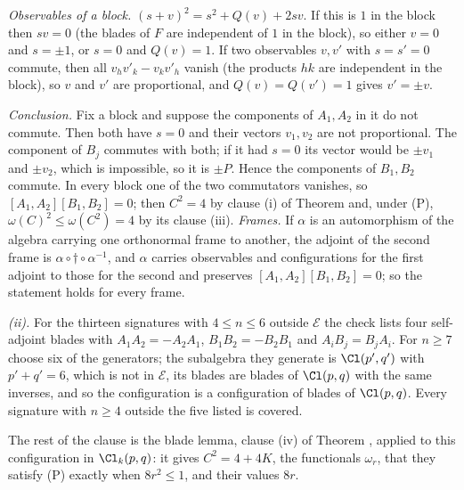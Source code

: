 \emph{Observables of a block.} $(s + v)^{2} = s^{2} + Q(v) + 2sv$. If this is $1$ in the block then $sv = 0$ (the blades of $F$ are independent of $1$ in the block), so either $v = 0$ and $s = \pm 1$, or $s = 0$ and $Q(v) = 1$. If two observables $v, v'$ with $s = s' = 0$ commute, then all $v_{h}v'_{k} - v_{k}v'_{h}$ vanish (the products $hk$ are independent in the block), so $v$ and $v'$ are proportional, and $Q(v) = Q(v') = 1$ gives $v' = \pm v$.

\emph{Conclusion.} Fix a block and suppose the components of $A_{1}, A_{2}$ in it do not commute. Then both have $s = 0$ and their vectors $v_{1}, v_{2}$ are not proportional. The component of $B_{j}$ commutes with both; if it had $s = 0$ its vector would be $\pm v_{1}$ and $\pm v_{2}$, which is impossible, so it is $\pm P$. Hence the components of $B_{1}, B_{2}$ commute. In every block one of the two commutators vanishes, so $[A_{1},A_{2}][B_{1},B_{2}] = 0$; then $C^{2} = 4$ by clause (i) of Theorem  and, under (P), $\omega(C)^{2} \le \omega(C^{2}) = 4$ by its clause (iii). \emph{Frames.} If $\alpha$ is an automorphism of the algebra carrying one orthonormal frame to another, the adjoint of the second frame is $\alpha \circ \dagger \circ \alpha^{-1}$, and $\alpha$ carries observables and configurations for the first adjoint to those for the second and preserves $[A_{1},A_{2}][B_{1},B_{2}] = 0$; so the statement holds for every frame.

\emph{(ii).} For the thirteen signatures with $4 \le n \le 6$ outside $\mathcal{E}$ the check lists four self-adjoint blades with $A_{1}A_{2} = -A_{2}A_{1}$, $B_{1}B_{2} = -B_{2}B_{1}$ and $A_{i}B_{j} = B_{j}A_{i}$. For $n \ge 7$ choose six of the generators; the subalgebra they generate is $\Cl(p',q')$ with $p' + q' = 6$, which is not in $\mathcal{E}$, its blades are blades of $\Cl(p,q)$ with the same inverses, and so the configuration is a configuration of blades of $\Cl(p,q)$. Every signature with $n \ge 4$ outside the five listed is covered.

The rest of the clause is the blade lemma, clause (iv) of Theorem , applied to this configuration in $\Cl_{k}(p,q)$: it gives $C^{2} = 4 + 4K$, the functionals $\omega_{r}$, that they satisfy (P) exactly when $8r^{2} \le 1$, and their values $8r$.

